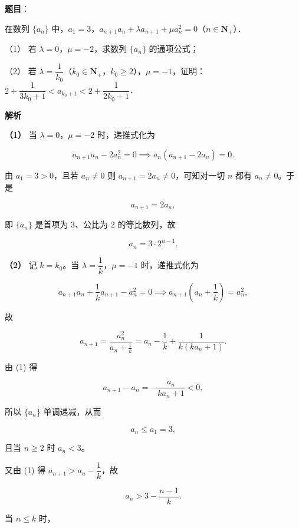 \begin{answer}

\textbf{题目}：

在数列 $\{a_{n}\}$ 中，$a_{1}=3$，$a_{n+1}a_{n}+\lambda a_{n+1}+\mu a_{n}^{2}=0$（$n\in\mathbf{N}_{+}$）．

（1） 若 $\lambda=0$，$\mu=-2$，求数列 $\{a_{n}\}$ 的通项公式；

（2） 若 $\lambda=\dfrac{1}{k_{0}}$（$k_{0}\in\mathbf{N}_{+}$，$k_{0}\ge 2$），$\mu=-1$，证明：$2+\dfrac{1}{3k_{0}+1}<a_{k_{0}+1}<2+\dfrac{1}{2k_{0}+1}$．

\textbf{解析}

\textbf{（1）} 当 $\lambda=0$，$\mu=-2$ 时，递推式化为

\nopagebreak[4]
\[
a_{n+1}a_{n}-2a_{n}^{2}=0
\implies a_{n}(a_{n+1}-2a_{n})=0.
\]

由 $a_{1}=3>0$，且若 $a_{n}\ne 0$ 则 $a_{n+1}=2a_{n}\ne 0$，可知对一切 $n$ 都有 $a_{n}\ne 0$。于是

\nopagebreak[4]
\[
a_{n+1}=2a_{n},
\]

即 $\{a_{n}\}$ 是首项为 $3$、公比为 $2$ 的等比数列，故

\nopagebreak[4]
\[
a_{n}=3\cdot 2^{n-1}.
\]

\textbf{（2）} 记 $k=k_{0}$。当 $\lambda=\dfrac{1}{k}$，$\mu=-1$ 时，递推式化为

\nopagebreak[4]
\[
a_{n+1}a_{n}+\frac{1}{k}a_{n+1}-a_{n}^{2}=0
\implies a_{n+1}\left(a_{n}+\frac{1}{k}\right)=a_{n}^{2},
\]

故

\nopagebreak[4]
\[
a_{n+1}=\frac{a_{n}^{2}}{a_{n}+\frac{1}{k}}
=a_{n}-\frac{1}{k}+\frac{1}{k(ka_{n}+1)}. \tag{1}
\]

由 (1) 得

\nopagebreak[4]
\[
a_{n+1}-a_{n}=-\frac{a_{n}}{ka_{n}+1}<0,
\]

所以 $\{a_{n}\}$ 单调递减，从而

\nopagebreak[4]
\[
a_{n}\le a_{1}=3,
\]

且当 $n\ge 2$ 时 $a_{n}<3$。

又由 (1) 得 $a_{n+1}>a_{n}-\dfrac{1}{k}$，故

\nopagebreak[4]
\[
a_{n}>3-\frac{n-1}{k}.
\]

当 $n\le k$ 时，


\end{answer}
